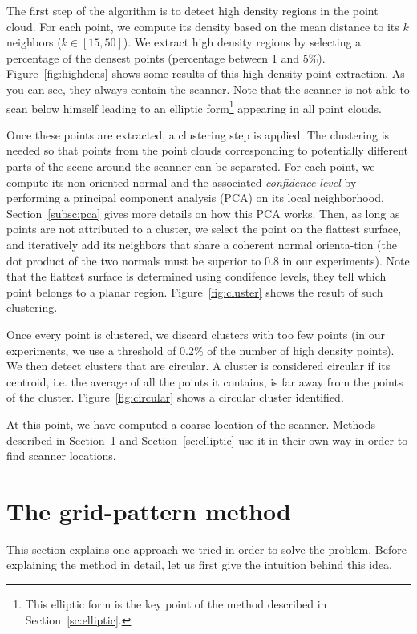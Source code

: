 The first step of the algorithm is to detect high density regions in the point cloud. For each point, we compute its density based on the mean distance to its $k$ neighbors ($k \in [15,50]$). We extract high density regions by selecting a percentage of the densest points (percentage between 1 and 5\%). Figure~\ref{fig:highdens} shows some results of this high density point extraction. As you can see, they always contain the scanner. Note that the scanner is not able to scan below himself leading to an elliptic form\footnote{This elliptic form is the key point of the method described in Section~\ref{sc:elliptic}.} appearing in all point clouds.

Once these points are extracted, a clustering step is applied. The clustering is needed so that points from the point clouds corresponding to potentially different parts of the scene around the scanner can be separated. For each point, we compute its non-oriented normal and the associated \emph{confidence level} by performing a principal component analysis (PCA) on its local neighborhood. Section~\ref{subsc:pca} gives more details on how this PCA works. Then, as long as points are not attributed
to a cluster, we select the point on the flattest surface, and iteratively add its neighbors that share a coherent normal orienta-tion (the dot product of the two normals must be superior to 0.8 in our experiments). Note that the  flattest surface is determined using condifence levels, they tell which point belongs to a planar region. Figure~\ref{fig:cluster} shows the result of such clustering.

Once every point is clustered, we discard clusters with too few points (in our experiments, we use a threshold of 0.2\% of the number of high density points). We then detect clusters that are circular. A cluster is considered circular if its centroid, i.e. the average of all the points it contains, is far away from the points of the cluster. Figure~\ref{fig:circular} shows a circular cluster identified.

At this point, we have computed a coarse location of the scanner. Methods described in Section~\ref{sc:grid-pattern} and Section~\ref{sc:elliptic} use it in their own way in order to find scanner locations.



\section{The grid-pattern method}
\label{sc:grid-pattern}
This section explains one approach we tried in order to solve the problem. Before explaining the method in detail, let us first give the intuition behind this idea.

